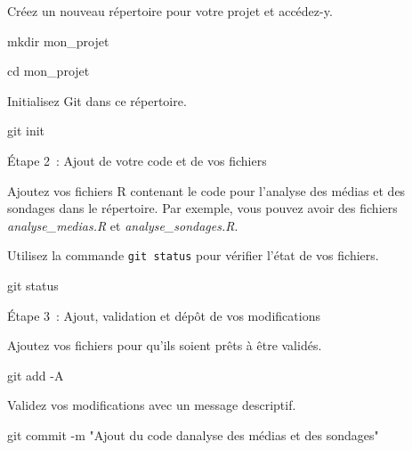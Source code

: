 \documentclass[
  letterpaper,
  DIV=11,
  numbers=noendperiod]{scrreprt}
\newenvironment{Shaded}{\begin{snugshade}}{\end{snugshade}}
\newcommand{\AttributeTok}[1]{\textcolor[rgb]{0.40,0.45,0.13}{#1}}
\newcommand{\BuiltInTok}[1]{\textcolor[rgb]{0.00,0.23,0.31}{#1}}
\newcommand{\FunctionTok}[1]{\textcolor[rgb]{0.28,0.35,0.67}{#1}}
\newcommand{\NormalTok}[1]{\textcolor[rgb]{0.00,0.23,0.31}{#1}}
\newcommand{\StringTok}[1]{\textcolor[rgb]{0.13,0.47,0.30}{#1}}
\begin{document}
Créez un nouveau répertoire pour votre projet et accédez-y.

\begin{Shaded}
\begin{Highlighting}[]
\FunctionTok{mkdir}\NormalTok{ mon\_projet}
\end{Highlighting}
\end{Shaded}

\begin{Shaded}
\begin{Highlighting}[]
\BuiltInTok{cd}\NormalTok{ mon\_projet}
\end{Highlighting}
\end{Shaded}

Initialisez Git dans ce répertoire.

\begin{Shaded}
\begin{Highlighting}[]
\FunctionTok{git}\NormalTok{ init}
\end{Highlighting}
\end{Shaded}

Étape 2~: Ajout de votre code et de vos fichiers

Ajoutez vos fichiers R contenant le code pour l'analyse des médias et
des sondages dans le répertoire. Par exemple, vous pouvez avoir des
fichiers \emph{analyse\_medias.R} et \emph{analyse\_sondages.R}.

Utilisez la commande \texttt{git\ status} pour vérifier l'état de vos
fichiers.

\begin{Shaded}
\begin{Highlighting}[]
\FunctionTok{git}\NormalTok{ status}
\end{Highlighting}
\end{Shaded}

Étape 3~: Ajout, validation et dépôt de vos modifications

Ajoutez vos fichiers pour qu'ils soient prêts à être validés.

\begin{Shaded}
\begin{Highlighting}[]
\FunctionTok{git}\NormalTok{ add }\AttributeTok{{-}A}
\end{Highlighting}
\end{Shaded}

Validez vos modifications avec un message descriptif.

\begin{Shaded}
\begin{Highlighting}[]
\FunctionTok{git}\NormalTok{ commit }\AttributeTok{{-}m} \StringTok{"Ajout du code d\textquotesingle{}analyse des médias et des sondages"}
\end{Highlighting}
\end{Shaded}
\end{document}
